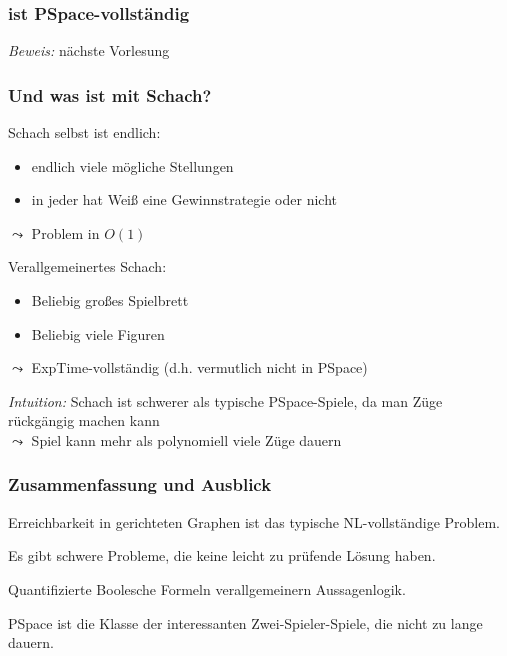 \documentclass[aspectratio=1610,onlymath]{beamer}
\begin{document}
\begin{frame}\frametitle{ ist PSpace-vollständig}

\pause

\emph{Beweis:} nächste Vorlesung

\end{frame}

\begin{frame}\frametitle{Und was ist mit Schach?}
\pause

Schach selbst ist endlich:
\begin{itemize}
\item endlich viele mögliche Stellungen
\item in jeder hat Weiß eine Gewinnstrategie oder nicht
\end{itemize}
$\leadsto$ Problem in $O(1)$
\bigskip\pause

\alert{Verallgemeinertes Schach:}
\begin{itemize}
\item Beliebig großes Spielbrett
\item Beliebig viele Figuren
\end{itemize}
$\leadsto$ ExpTime-vollständig (d.h. vermutlich nicht in PSpace)
\bigskip\pause

\emph{Intuition:} Schach ist schwerer als typische PSpace-Spiele, da man 
Züge rückgängig machen kann\\
$\leadsto$ Spiel kann mehr als polynomiell viele Züge dauern
\end{frame}



\begin{frame}\frametitle{Zusammenfassung und Ausblick}

Erreichbarkeit in gerichteten Graphen ist das typische NL-vollständige Problem.
\bigskip

Es gibt schwere Probleme, die keine leicht zu prüfende Lösung haben.\bigskip

Quantifizierte Boolesche Formeln verallgemeinern Aussagenlogik.\bigskip

PSpace ist die Klasse der interessanten Zwei-Spieler-Spiele, die nicht zu lange dauern.
\bigskip


\end{frame}
\end{document}
